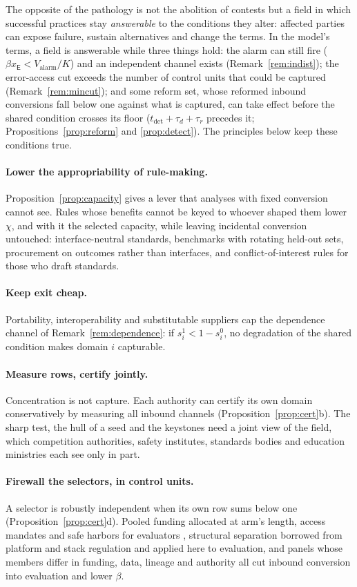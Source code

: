 \documentclass[letterpaper]{article} %
\theoremstyle{definition}
\newcommand{\dE}{\mathsf{E}}
\newcommand{\Valarm}{V_{\mathrm{alarm}}}
\begin{document}
The opposite of the pathology is not the abolition of contests but a field in which successful practices stay \emph{answerable} to the conditions they alter: affected parties can expose failure, sustain alternatives and change the terms. In the model's terms, a field is answerable while three things hold: the alarm can still fire ($\beta x_\dE<\Valarm/K$) and an independent channel exists (Remark~\ref{rem:indist}); the error-access cut exceeds the number of control units that could be captured (Remark~\ref{rem:mincut}); and some reform set, whose reformed inbound conversions fall below one against what is captured, can take effect before the shared condition crosses its floor ($t_{\mathrm{det}}+\tau_d+\tau_r$ precedes it; Propositions~\ref{prop:reform} and \ref{prop:detect}). The principles below keep these conditions true.

\paragraph{Lower the appropriability of rule-making.} Proposition~\ref{prop:capacity} gives a lever that analyses with fixed conversion cannot see. Rules whose benefits cannot be keyed to whoever shaped them lower $\chi$, and with it the selected capacity, while leaving incidental conversion untouched: interface-neutral standards, benchmarks with rotating held-out sets, procurement on outcomes rather than interfaces, and conflict-of-interest rules for those who draft standards.

\paragraph{Keep exit cheap.} Portability, interoperability and substitutable suppliers cap the dependence channel of Remark~\ref{rem:dependence}: if $s^1_i<1-s^0_i$, no degradation of the shared condition makes domain $i$ capturable.

\paragraph{Measure rows, certify jointly.} Concentration is not capture. Each authority can certify its own domain conservatively by measuring all inbound channels (Proposition~\ref{prop:cert}b). The sharp test, the hull of a seed and the keystones need a joint view of the field, which competition authorities, safety institutes, standards bodies and education ministries each see only in part.

\paragraph{Firewall the selectors, in control units.} A selector is robustly independent when its own row sums below one (Proposition~\ref{prop:cert}d). Pooled funding allocated at arm's length, access mandates and safe harbors for evaluators \citep{longpre2024}, structural separation borrowed from platform and stack regulation \citep{khan2019,narechania2024} and applied here to evaluation, and panels whose members differ in funding, data, lineage and authority all cut inbound conversion into evaluation and lower $\beta$.
\end{document}
